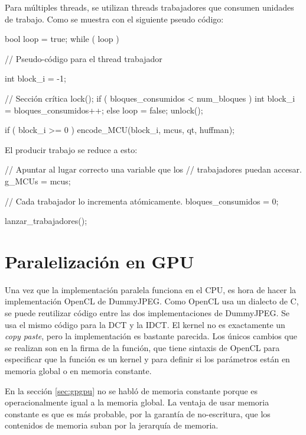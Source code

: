 Para múltiples threads, se utilizan threads trabajadores que consumen unidades
de trabajo. Como se muestra con el siguiente pseudo código:

\begin{code}[language=C][h]
    bool loop = true;
    while ( loop ) {
        // Pseudo-código para el thread trabajador

        int block_i = -1;

        // Sección crítica
        lock();
        if ( bloques_consumidos < num_bloques ) {
            int block_i = bloques_consumidos++;
        } else {
            loop = false;
        }
        unlock();

        if ( block_i >= 0 ) {
            encode_MCU(block_i, mcus, qt, huffman);
        }
    }
\end{code}

El producir trabajo se reduce a esto:

\begin{code}[language=C][h]
    // Apuntar al lugar correcto una variable que los
    // trabajadores puedan accesar.
    g_MCUs = mcus;

    // Cada trabajador lo incrementa atómicamente.
    bloques_consumidos = 0;

    lanzar_trabajadores();
\end{code}

\section{Paralelización en GPU}

Una vez que la implementación paralela funciona en el CPU, es hora de hacer la
implementación OpenCL de DummyJPEG. Como OpenCL usa un dialecto de C, se puede
reutilizar código entre las dos implementaciones de DummyJPEG. Se usa el mismo
código para la DCT y la IDCT. El kernel no es exactamente un \emph{copy paste},
pero la implementación es bastante parecida. Los únicos cambios que se realizan
son en la firma de la función, que tiene sintaxis de OpenCL para especificar
que la función es un kernel y para definir si los parámetros están en memoria
global o en memoria constante.

En la sección \ref{sec:gpgpu} no se habló de memoria constante porque es
operacionalmente igual a la memoria global. La ventaja de usar memoria
constante es que es más probable, por la garantía de no-escritura, que los
contenidos de memoria suban por la jerarquía de memoria.

